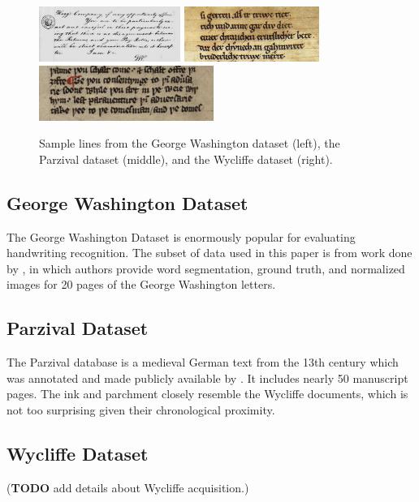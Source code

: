 \documentclass[final]{ukthesis}
\begin{document}
\begin{figure}[t]
\begin{center}
\includegraphics[height=1.8cm]{gw-sample}
\includegraphics[height=1.8cm]{parzival-sample}
\includegraphics[height=1.8cm]{wycliffe-sample}
\end{center}
\caption{Sample lines from the George Washington dataset (left), the Parzival dataset (middle), and the Wycliffe dataset (right).}
\label{fig:dataset-samples}
\end{figure}


\subsection{George Washington Dataset}
The George Washington Dataset is enormously popular for evaluating handwriting recognition. The subset of data used in this paper is from work done by \cite{fischer2012lexicon}, in which authors provide word segmentation, ground truth, and normalized images for 20 pages of the George Washington letters.

\subsection{Parzival Dataset}
The Parzival database is a medieval German text from the 13th century which was annotated and made publicly available by \cite{fischer2010ground}. It includes nearly 50 manuscript pages. The ink and parchment closely resemble the Wycliffe documents, which is not too surprising given their chronological proximity.

\subsection{Wycliffe Dataset}
(\textbf{TODO} add details about Wycliffe acquisition.)
\end{document}
